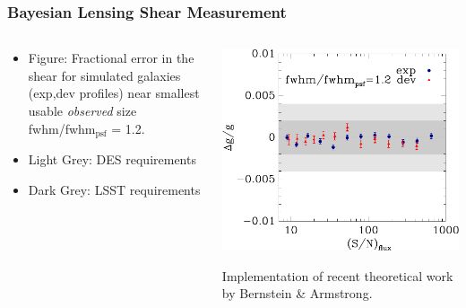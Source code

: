 \documentclass{beamer}
\begin{document}
\frame
{
    \frametitle{Bayesian Lensing Shear Measurement}

    \begin{columns}
        \begin{column}{0.4\textwidth}
            \begin{itemize}

                \item Figure: Fractional error in the shear for simulated galaxies
                    (exp,dev profiles) near smallest usable {\it observed} size
                    fwhm/fwhm$_{\textrm{psf}}$ = 1.2.

                \item Light Grey: DES requirements
                \item Dark Grey: LSST requirements
            \end{itemize}
        \end{column}
        \begin{column}{0.6\textwidth}
            \includegraphics[width=\textwidth]{ngmix-flux-s2n-sigrat-20.pdf}
            \newline

            {\tiny Implementation of recent theoretical work by Bernstein \&
             Armstrong.\par}

        \end{column}
    \end{columns}

}
\end{document}
